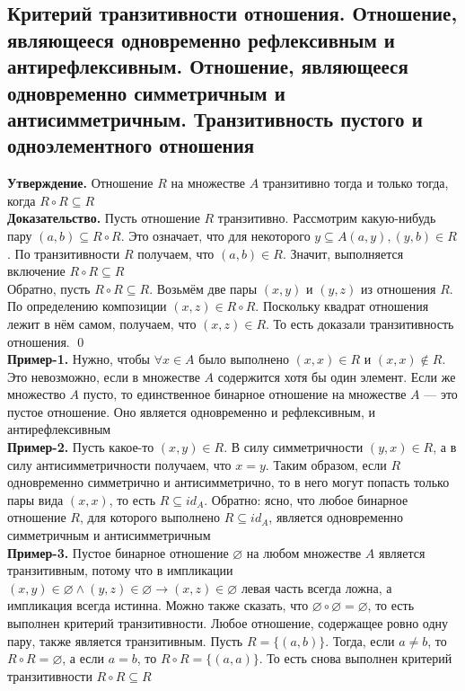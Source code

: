 \documentclass[a4paper]{article}
\begin{document}
\subsection{Критерий транзитивности отношения. Отношение, являющееся одновременно рефлексивным и антирефлексивным. Отношение, являющееся одновременно симметричным и антисимметричным. Транзитивность пустого и одноэлементного отношения}
\label{sec:2.41}\textbf{Утверждение.} Отношение $R$ на множестве $A$ транзитивно тогда и только тогда, когда $R\circ R\subseteq R$\\[2mm]
\textbf{Доказательство.} Пусть отношение $R$ транзитивно. Рассмотрим какую-нибудь пару $(a, b)\subseteq R\circ R$. Это означает, что для некоторого $y\subseteq A (a, y), (y, b) \in R$. По транзитивности $R$ получаем, что $(a, b)\in R$. Значит, выполняется включение $R\circ R\subseteq R$\\[2mm] 
 Обратно, пусть $R\circ R\subseteq R$. Возьмём две пары $(x, y)$ и $(y, z)$ из отношения $R$. По определению композиции $(x, z)\in R\circ R$. Поскольку квадрат отношения лежит в нём самом, получаем, что $(x, z)\in R$. То есть доказали транзитивность отношения. \qed\\[2mm]
\textbf{Пример-1.} Нужно, чтобы $\forall x\in A$ было выполнено $(x, x)\in R$ и $(x, x)\notin R$. Это невозможно, если в множестве $A$ содержится хотя бы один элемент. Если же множество $A$ пусто, то единственное бинарное отношение на множестве $A$ — это пустое отношение. Оно является одновременно и рефлексивным, и антирефлексивным\\[2mm]
\textbf{Пример-2.} Пусть какое-то $(x, y)\in R$. В силу симметричности $(y, x)\in R$, а в силу антисимметричности получаем, что $x=y$. Таким образом, если $R$ одновременно симметрично и антисимметрично, то в него могут попасть только пары вида $(x, x)$, то есть $R\subseteq id_A$. Обратно: ясно, что любое бинарное отношение $R$, для которого выполнено $R\subseteq id_A$, является одновременно симметричным и антисимметричным\\[2mm]
\textbf{Пример-3.} Пустое бинарное отношение $\varnothing$ на любом множестве $A$ является транзитивным, потому что в импликации $(x,y)\in\varnothing\wedge(y,z)\in\varnothing\rightarrow(x,z)\in\varnothing$ левая часть всегда ложна, а импликация всегда истинна. Можно также сказать, что $\varnothing\circ\varnothing = \varnothing$, то есть выполнен критерий транзитивности. Любое отношение, содержащее ровно одну пару, также является транзитивным. Пусть $R = \{(a, b)\}$. Тогда, если $a\ne b$, то $R\circ R = \varnothing$, а если $a = b$, то $R\circ R = \{(a, a)\}$. То есть снова выполнен критерий транзитивности $R\circ R\subseteq R$
\end{document}
